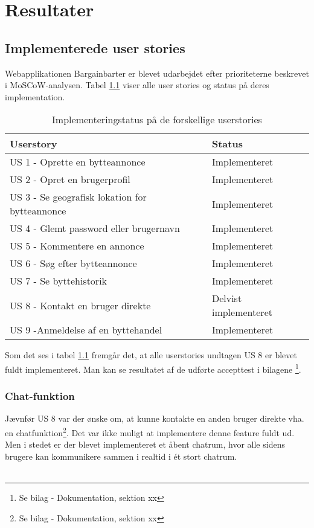 \chapter{Resultater}\label{ch:Resultat og Diskussion}
\section{Implementerede user stories}
Webapplikationen Bargainbarter er blevet udarbejdet efter prioriteterne beskrevet i MoSCoW-analysen. Tabel \ref{fig:Implementeringsstatus} viser alle user stories og status på deres implementation.

\begin{table}[H]
	\begin{tabular}{ | l | p{5cm} |}
		\hline
		\textbf{Userstory}  & \textbf{Status} \\ \hline
		US 1 - Oprette en bytteannonce  & Implementeret \\ \hline
		US 2 - Opret en brugerprofil & Implementeret \\ \hline
		US 3 - Se geografisk lokation for bytteannonce & Implementeret \\ \hline
		US 4 - Glemt password eller brugernavn & Implementeret \\ \hline
		US 5 - Kommentere en annonce & Implementeret \\ \hline
		US 6 - Søg efter bytteannonce & Implementeret \\ \hline
		US 7 - Se byttehistorik & Implementeret \\ \hline	
		US 8 - Kontakt en bruger direkte & Delvist implementeret \\ \hline	
		US 9 -Anmeldelse af en byttehandel & Implementeret \\ \hline	
	\end{tabular}
\caption{Implementeringstatus på de forskellige userstories}
\label{fig:Implementeringsstatus}
\end{table}

Som det ses i tabel \ref{fig:Implementeringsstatus} fremgår det, at alle userstories undtagen  US 8 er blevet fuldt implementeret. Man kan se resultatet af de udførte accepttest i bilagene \footnote{Se bilag - Dokumentation, sektion xx}.

\subsection{Chat-funktion}
Jævnfør US 8 var der ønske om, at kunne kontakte en anden bruger direkte vha. en chatfunktion\footnote{Se bilag - Dokumentation, sektion xx}. Det var ikke muligt at implementere denne feature fuldt ud. Men i stedet er der blevet implementeret et åbent chatrum, hvor alle sidens brugere kan kommunikere sammen i realtid i ét stort chatrum.\\ \\


